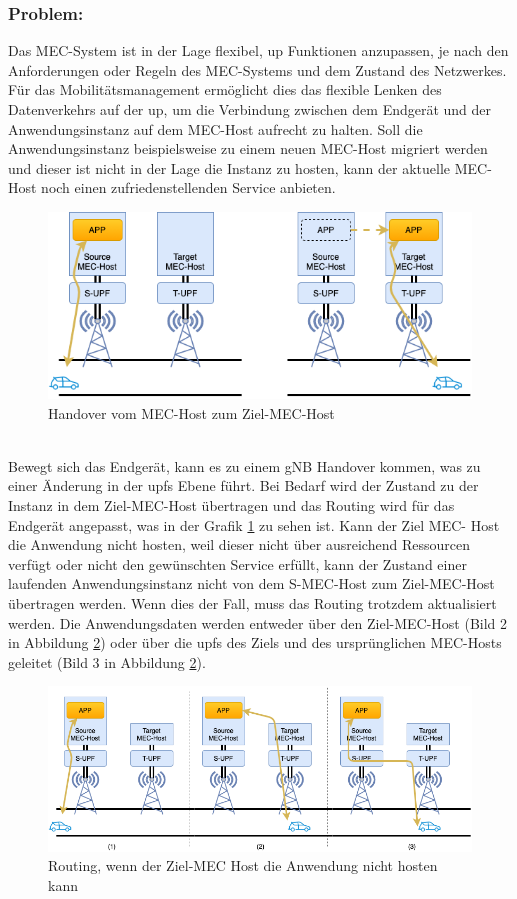 \documentclass[runningheads]{llncs}
\numberwithin{figure}{section}
\begin{document}
\subsubsection{Problem:}
Das MEC-System ist in der Lage flexibel, \acrlong{up} Funktionen anzupassen, je nach den Anforderungen oder Regeln des MEC-Systems 
und dem Zustand des Netzwerkes. Für das Mobilitätsmanagement ermöglicht dies das flexible Lenken des Datenverkehrs auf der \acrshort{up},
um die Verbindung zwischen dem Endgerät und der Anwendungsinstanz auf dem MEC-Host aufrecht zu halten. Soll die Anwendungsinstanz
beispielsweise zu einem neuen MEC-Host migriert werden und dieser ist nicht in der Lage die Instanz zu hosten, kann der aktuelle
MEC-Host noch einen zufriedenstellenden Service anbieten.
\begin{figure}
  \includegraphics[width=\linewidth]{images/Verschieben_Instanz.png}
  \caption{Handover vom MEC-Host zum Ziel-MEC-Host}
  \label{fig:Verschieben_Instanz}
\end{figure}
\\
Bewegt sich das Endgerät, kann es zu einem gNB Handover kommen, was zu einer Änderung in der \acrshort{upf}s Ebene führt. 
Bei Bedarf wird der Zustand zu der Instanz in dem Ziel-MEC-Host übertragen und das Routing wird für das Endgerät angepasst, 
was in der Grafik \ref{fig:Verschieben_Instanz} zu sehen ist.
Kann der Ziel MEC- Host die Anwendung nicht hosten, weil dieser nicht über ausreichend Ressourcen verfügt oder nicht den gewünschten Service
erfüllt, kann der Zustand einer laufenden Anwendungsinstanz nicht von dem S-MEC-Host zum Ziel-MEC-Host übertragen werden. 
Wenn dies der Fall, muss das Routing
trotzdem aktualisiert werden. Die Anwendungsdaten werden entweder über den Ziel-MEC-Host (Bild 2 in Abbildung \ref{fig:mecerror}) 
oder über die \acrshort{upf}s des Ziels und des ursprünglichen MEC-Hosts geleitet (Bild 3 in Abbildung \ref{fig:mecerror}).
\begin{figure}
  \includegraphics[width=\linewidth]{images/MEC_host_Error.png}
  \caption{Routing, wenn der Ziel-MEC Host die Anwendung nicht hosten kann}
  \label{fig:mecerror}
\end{figure}
\end{document}
